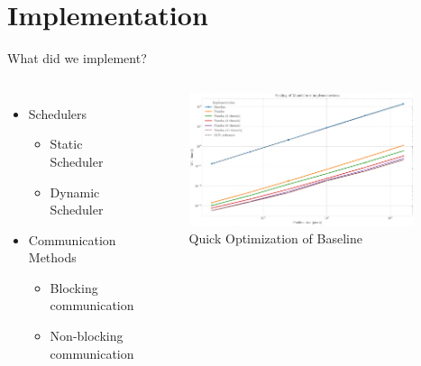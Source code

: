 
\section{Implementation}

\begin{frame}{What did we implement?}
    \begin{columns}
    \begin{itemize}
        \item Schedulers
          \begin{itemize}
            \item Static Scheduler
            \item Dynamic Scheduler
          \end{itemize}
        \item Communication Methods
          \begin{itemize}
            \item Blocking communication
            \item Non-blocking communication
          \end{itemize}
    \end{itemize}

        \begin{figure}
          \begin{center}
            \includegraphics[width=0.95\textwidth]{figures/Plots/0_numba_vs_baseline/numba_vs_baseline.pdf}
          \end{center}
          \caption*{Quick Optimization of Baseline}\label{fig:quick_optimization_baseline}
        \end{figure}
        
    \end{columns}
\end{frame}

